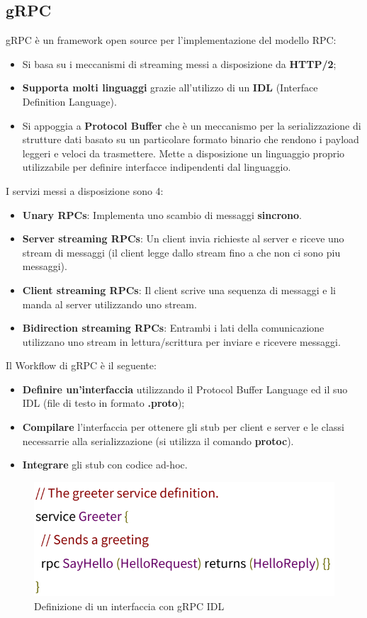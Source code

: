 \documentclass[12pt]{article}
\begin{document}
	\subsection{gRPC}
		gRPC è un framework open source per l'implementazione del modello RPC:
		\begin{itemize}
			\item Si basa su i meccanismi di streaming messi a disposizione da \textbf{ HTTP/2};
			\item \textbf{Supporta molti linguaggi} grazie all'utilizzo di un \textbf{IDL} (Interface Definition Language).
			\item Si appoggia a \textbf{Protocol Buffer} che è un meccanismo per la serializzazione di strutture dati basato su un particolare formato binario che rendono i payload leggeri e veloci da trasmettere. Mette a disposizione un linguaggio proprio utilizzabile per definire interfacce indipendenti dal linguaggio.
		\end{itemize}
		I servizi messi a disposizione sono 4:
		\begin{itemize}
			\item \textbf{Unary RPCs}: Implementa uno scambio di messaggi \textbf{sincrono}.
			\item \textbf{Server streaming RPCs}: Un client invia richieste al server e riceve uno stream di messaggi (il client legge dallo stream fino a che non ci sono piu messaggi).
			\item \textbf{Client streaming RPCs}: Il client scrive una sequenza di messaggi e li manda al server utilizzando uno stream.
			\item \textbf{Bidirection streaming RPCs}: Entrambi i lati della comunicazione utilizzano uno stream in lettura/scrittura per inviare e ricevere messaggi.  
		\end{itemize}
		Il Workflow di gRPC è il seguente:
		\begin{itemize}
			\item \textbf{Definire un'interfaccia} utilizzando il Protocol Buffer Language ed il suo IDL (file di testo in formato \textbf{.proto});
			\item \textbf{Compilare} l'interfaccia per ottenere gli stub per client e server e le classi necessarrie alla serializzazione (si utilizza il comando \textbf{protoc}).
			\item \textbf{Integrare} gli stub con codice ad-hoc.
		\end{itemize}
		\begin{figure}[h!]
			\centering
			\includegraphics[scale=0.30]{img/idl.png}
			\caption{Definizione di un interfaccia con gRPC IDL}
		\end{figure}
	
\end{document}
